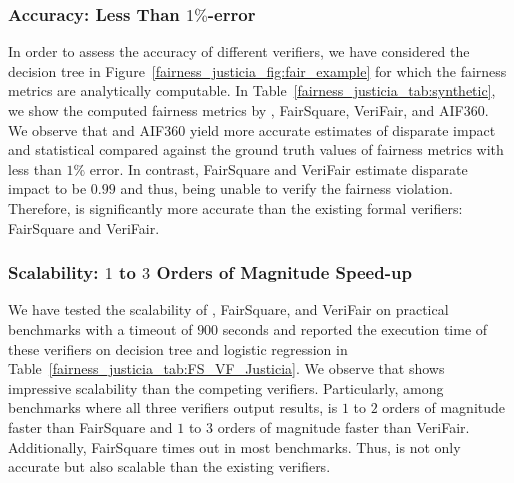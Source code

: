 


\subsubsection{Accuracy: Less Than $  1\%$-error} 
In order to assess the accuracy of different verifiers, we have considered the decision tree in Figure~\ref{fairness_justicia_fig:fair_example} for which the fairness metrics  are analytically computable. 
In Table~\ref{fairness_justicia_tab:synthetic}, we show the computed fairness metrics by {\justicia}, FairSquare, VeriFair, and AIF360. We observe that {\justicia} and AIF360  yield more accurate estimates of disparate impact and statistical compared against the ground truth values of fairness metrics with less than $1\%$ error. In contrast, FairSquare and VeriFair  estimate disparate impact to be $0.99$ and thus, being unable to verify the fairness violation. Therefore, {\justicia} is significantly more accurate than the existing formal verifiers: FairSquare and VeriFair. 





\subsubsection{Scalability: $ 1 $ to $ 3 $ Orders of Magnitude Speed-up} 
We have tested the scalability of {\justicia}, FairSquare, and VeriFair on practical benchmarks with a timeout of $900$ seconds and reported the execution time of these verifiers on decision tree and logistic regression in Table~\ref{fairness_justicia_tab:FS_VF_Justicia}. We observe that {\justicia} shows impressive scalability than the competing verifiers. Particularly, among benchmarks where all three verifiers output results, {\justicia} is $ 1 $ to $ 2 $ orders of magnitude faster than FairSquare and  $ 1 $ to $ 3 $ orders of magnitude faster than VeriFair. Additionally, FairSquare times out in most  benchmarks.
Thus, {\justicia} is not only accurate but also scalable than the existing verifiers. 


